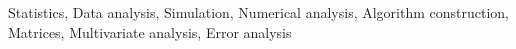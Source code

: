 \documentclass[]{article}
\begin{document}
Statistics, Data analysis, Simulation, Numerical analysis, Algorithm construction, Matrices, Multivariate analysis, Error analysis
\end{document}
